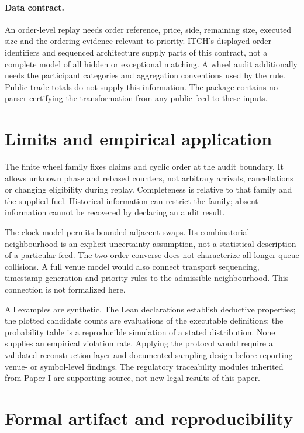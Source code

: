 \documentclass[11pt]{article}
\theoremstyle{definition}
\theoremstyle{remark}
\begin{document}
\paragraph{Data contract.} An order-level replay needs order reference, price, side, remaining size, executed size and the ordering evidence relevant to priority. ITCH's displayed-order identifiers and sequenced architecture supply parts of this contract, not a complete model of all hidden or exceptional matching. A wheel audit additionally needs the participant categories and aggregation conventions used by the rule. Public trade totals do not supply this information. The package contains no parser certifying the transformation from any public feed to these inputs.

\section{Limits and empirical application}\label{sec:limits}

The finite wheel family fixes claims and cyclic order at the audit boundary. It allows unknown phase and rebased counters, not arbitrary arrivals, cancellations or changing eligibility during replay. Completeness is relative to that family and the supplied fuel. Historical information can restrict the family; absent information cannot be recovered by declaring an audit result.

The clock model permits bounded adjacent swaps. Its combinatorial neighbourhood is an explicit uncertainty assumption, not a statistical description of a particular feed. The two-order converse does not characterize all longer-queue collisions. A full venue model would also connect transport sequencing, timestamp generation and priority rules to the admissible neighbourhood. This connection is not formalized here.

All examples are synthetic. The Lean declarations establish deductive properties; the plotted candidate counts are evaluations of the executable definitions; the probability table is a reproducible simulation of a stated distribution. None supplies an empirical violation rate. Applying the protocol would require a validated reconstruction layer and documented sampling design before reporting venue- or symbol-level findings. The regulatory traceability modules inherited from Paper I are supporting source, not new legal results of this paper.

\section{Formal artifact and reproducibility}\label{sec:artifact}
\end{document}

